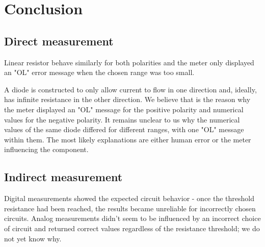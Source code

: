 \section{Conclusion}
\subsection{Direct measurement}

Linear resistor behave similarly for both polarities and the meter only displayed an "OL" error message when the chosen range was too small. 

A diode is constructed to only allow current to flow in one direction and, ideally, has infinite resistance in the other direction. We believe that is the reason why the meter displayed an "OL" message for the positive polarity and numerical values for the negative polarity. It remains unclear to us why the numerical values of the same diode differed for different ranges, with one "OL" message within them. The most likely explanations are either human error or the meter influencing the component.

\subsection{Indirect measurement}

Digital measurements showed the expected circuit behavior - once the threshold resistance had been reached, the results became unreliable for incorrectly chosen circuits. Analog measurements didn't seem to be influenced by an incorrect choice of circuit and returned correct values regardless of the resistance threshold; we do not yet know why.